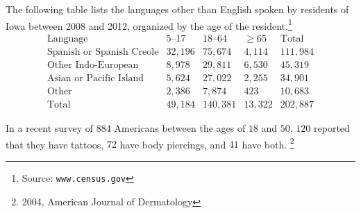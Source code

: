 \documentclass[addpoints,12pt]{exam}
\begin{document}
\begin{questions}
\question[18] The following table lists
the languages other than English spoken by residents
of Iowa between 2008 and 2012, organized by the age
of the resident.\footnote{Source: {\tt www.census.gov}}
\[\begin{array}{r|rrr|r}
\text{Language}&\text{$5$--$17$}
&\text{$18$--$64$}&\ge 65&\text{Total}\\\hline
\text{Spanish or Spanish Creole}&32,196&75,674&4,114&111,984\\
\text{Other Indo-European}&8,978&29,811&6,530&45,319\\
\text{Asian or Pacific Island}&5,624&27,022&2,255&34,901\\
\text{Other}&2,386&7,874&423&10,683\\\hline
\text{Total}&49,184&140,381&13,322&202,887
\end{array}\]
\newpage

\question[24] In a recent survey of 884 Americans between the ages
of $18$ and $50$, $120$ reported that they have tattoos,
$72$ have body piercings, and $41$ have both.
\footnote{2004, American Journal of Dermatology}

\begin{parts}

\end{parts}
\end{questions}
\end{document}
